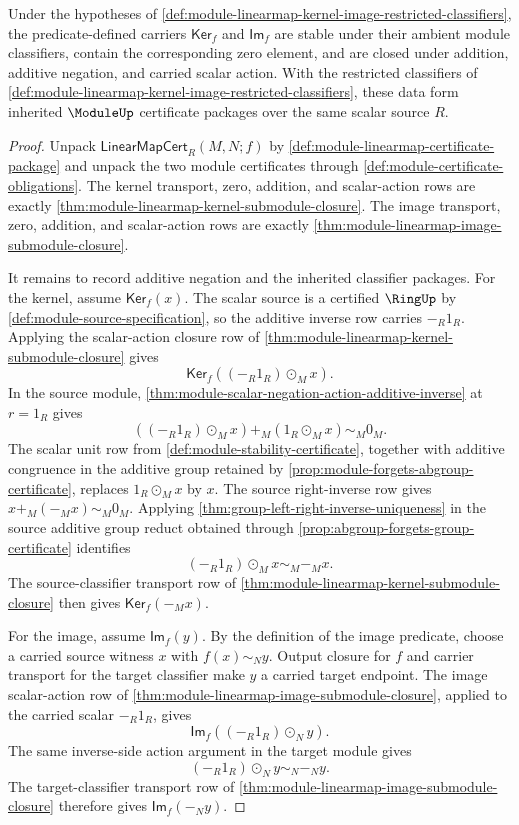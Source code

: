 \begin{theorem}
\label{thm:module-linearmap-kernel-image-inherited-module-classifiers}
Under the hypotheses of \autoref{def:module-linearmap-kernel-image-restricted-classifiers}, the predicate-defined carriers $\mathsf{Ker}_f$ and $\mathsf{Im}_f$ are stable under their ambient module classifiers, contain the corresponding zero element, and are closed under addition, additive negation, and carried scalar action. With the restricted classifiers of \autoref{def:module-linearmap-kernel-image-restricted-classifiers}, these data form inherited $\ModuleUp$ certificate packages over the same scalar source $R$.
\end{theorem}
\begin{proof}
Unpack $\mathsf{LinearMapCert}_R(M,N;f)$ by \autoref{def:module-linearmap-certificate-package} and unpack the two module certificates through \autoref{def:module-certificate-obligations}. The kernel transport, zero, addition, and scalar-action rows are exactly \autoref{thm:module-linearmap-kernel-submodule-closure}. The image transport, zero, addition, and scalar-action rows are exactly \autoref{thm:module-linearmap-image-submodule-closure}.

It remains to record additive negation and the inherited classifier packages. For the kernel, assume $\mathsf{Ker}_f(x)$. The scalar source is a certified $\RingUp$ by \autoref{def:module-source-specification}, so the additive inverse row carries $-_R1_R$. Applying the scalar-action closure row of \autoref{thm:module-linearmap-kernel-submodule-closure} gives
$$
\mathsf{Ker}_f((-_R1_R)\odot_M x).
$$
In the source module, \autoref{thm:module-scalar-negation-action-additive-inverse} at $r=1_R$ gives
$$
((-_R1_R)\odot_Mx)+_M(1_R\odot_Mx)\sim_M0_M.
$$
The scalar unit row from \autoref{def:module-stability-certificate}, together with additive congruence in the additive group retained by \autoref{prop:module-forgets-abgroup-certificate}, replaces $1_R\odot_Mx$ by $x$. The source right-inverse row gives $x+_M(-_Mx)\sim_M0_M$. Applying \autoref{thm:group-left-right-inverse-uniqueness} in the source additive group reduct obtained through \autoref{prop:abgroup-forgets-group-certificate} identifies
$$
(-_R1_R)\odot_Mx\sim_M-_Mx.
$$
The source-classifier transport row of \autoref{thm:module-linearmap-kernel-submodule-closure} then gives $\mathsf{Ker}_f(-_Mx)$.

For the image, assume $\mathsf{Im}_f(y)$. By the definition of the image predicate, choose a carried source witness $x$ with $f(x)\sim_Ny$. Output closure for $f$ and carrier transport for the target classifier make $y$ a carried target endpoint. The image scalar-action row of \autoref{thm:module-linearmap-image-submodule-closure}, applied to the carried scalar $-_R1_R$, gives
$$
\mathsf{Im}_f((-_R1_R)\odot_N y).
$$
The same inverse-side action argument in the target module gives
$$
(-_R1_R)\odot_Ny\sim_N-_Ny.
$$
The target-classifier transport row of \autoref{thm:module-linearmap-image-submodule-closure} therefore gives $\mathsf{Im}_f(-_Ny)$.


\end{proof}
